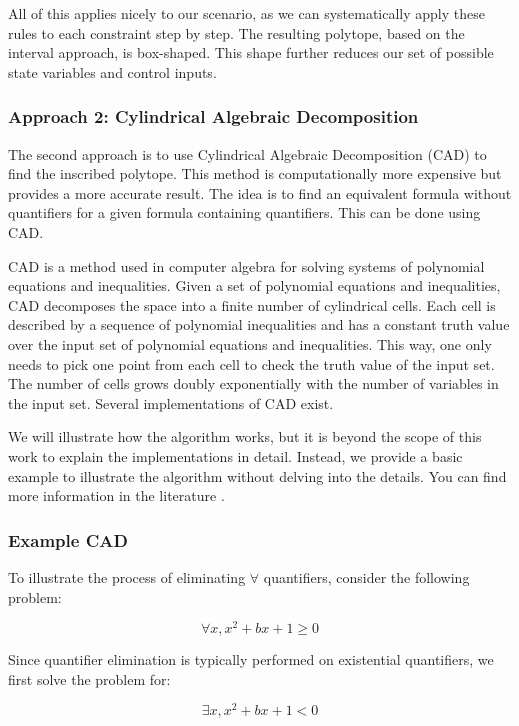 All of this applies nicely to our scenario, as we can systematically apply these rules to each constraint step by step.
The resulting polytope, based on the interval approach, is box-shaped.
This shape further reduces our set of possible state variables and control inputs.

\subsubsection{Approach 2: Cylindrical Algebraic Decomposition} \label{subsubsec:cad}

The second approach is to use Cylindrical Algebraic Decomposition (CAD) to find the inscribed polytope.
This method is computationally more expensive but provides a more accurate result.
The idea is to find an equivalent formula without quantifiers for a given formula containing quantifiers.
This can be done using CAD.

CAD is a method used in computer algebra for solving systems of polynomial equations and inequalities.
Given a set of polynomial equations and inequalities, CAD decomposes the space into a finite number of cylindrical cells.
Each cell is described by a sequence of polynomial inequalities and has a constant truth value over the input set of polynomial equations and
inequalities.
This way, one only needs to pick one point from each cell to check the truth value of the input set.
The number of cells grows doubly exponentially with the number of variables in the input set.
Several implementations of CAD exist.

We will illustrate how the algorithm works, but it is beyond the scope of this work to explain the implementations in detail.
Instead, we provide a basic example to illustrate the algorithm without delving into the details.
You can find more information in the literature \cite{caviness_quantifier_1998, england_cylindrical_2020}.

\subsubsection{Example CAD}
To illustrate the process of eliminating $\forall$ quantifiers, consider the following problem:

\[ \forall x, x^2 + bx + 1 \geq 0
\]

Since quantifier elimination is typically performed on existential quantifiers, we first solve the problem for:

\[ \exists x, x^2 + bx + 1 < 0 \]

